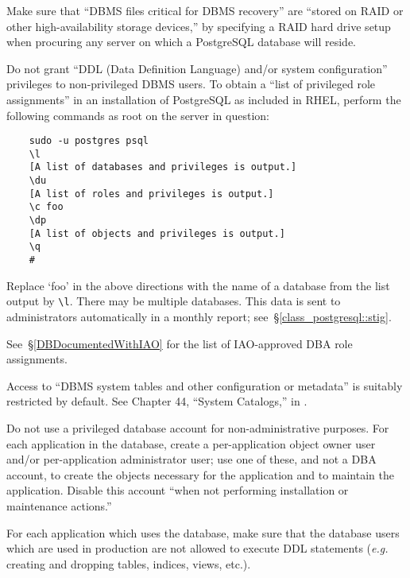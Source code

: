 %
Make sure that ``DBMS files critical for DBMS recovery'' are ``stored on
RAID or other high-availability storage devices,'' by specifying a RAID
hard drive setup when procuring any server on which a PostgreSQL database
will reside.

%
Do not grant ``DDL (Data Definition Language) and/or system
configuration'' privileges to non-privileged DBMS users. To obtain a
``list of privileged role assignments'' in an installation of PostgreSQL
as included in RHEL, perform the following commands as root on the server
in question:

\begin{verbatim}
    sudo -u postgres psql
    \l
    [A list of databases and privileges is output.]
    \du
    [A list of roles and privileges is output.]
    \c foo
    \dp
    [A list of objects and privileges is output.]
    \q
    #
\end{verbatim}

Replace `foo' in the above directions with the name of a database from the
list output by \verb!\l!. There may be multiple databases. This data is
sent to administrators automatically in a monthly report;
see~\S\ref{class_postgresql::stig}. 

See~\S\ref{DBDocumentedWithIAO} for the list of IAO-approved DBA role
assignments.


%
Access to ``DBMS system tables and other configuration or metadata'' is
suitably restricted by default. See Chapter 44, ``System Catalogs,'' in
\cite{pgsql-documentation}.

%
Do not use a privileged database account for non-administrative purposes.
For each application in the database, create a per-application object
owner user and/or per-application administrator user; use one of these,
and not a DBA account, to create the objects necessary for the application
and to maintain the application. Disable this account ``when not
performing installation or maintenance actions.''

%
For each application which uses the database, make sure that the database
users which are used in production are not allowed to execute DDL
statements (\emph{e.g.} creating and dropping tables, indices, views,
etc.).

